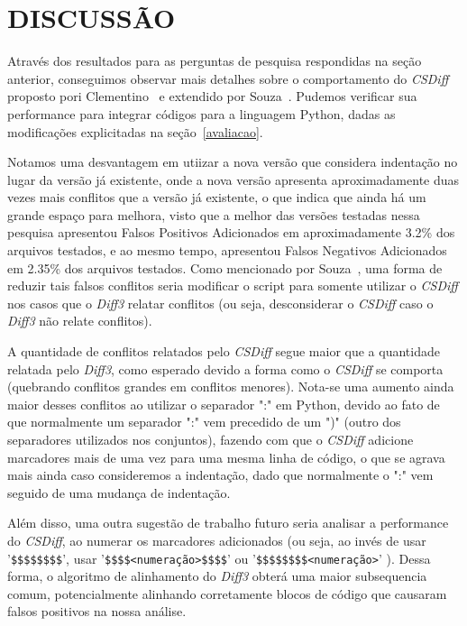 \section{DISCUSSÃO}\label{discussao}

Através dos resultados para as perguntas de pesquisa respondidas na seção
anterior, conseguimos observar mais detalhes sobre o comportamento do
\emph{CSDiff} proposto pori Clementino~\cite{clem21} e extendido por
Souza~\cite{heitor21}. Pudemos verificar sua performance para integrar códigos
para a linguagem Python, dadas as modificações explicitadas na
seção~\ref{avaliacao}.

Notamos uma desvantagem em utiizar a nova versão que considera indentação no
lugar da versão já existente, onde a nova versão apresenta aproximadamente duas
vezes mais conflitos que a versão já existente, o que indica que ainda há um
grande espaço para melhora, visto que a melhor das versões testadas nessa
pesquisa apresentou Falsos Positivos Adicionados em aproximadamente 3.2\% dos
arquivos testados, e ao mesmo tempo, apresentou Falsos Negativos Adicionados em
2.35\% dos arquivos testados. Como mencionado por Souza~\cite{heitor21}, uma
forma de reduzir tais falsos conflitos seria modificar o script para somente
utilizar o \emph{CSDiff} nos casos que o \emph{Diff3} relatar conflitos (ou
seja, desconsiderar o \emph{CSDiff} caso o \emph{Diff3} não relate conflitos).

A quantidade de conflitos relatados pelo \emph{CSDiff} segue maior que a
quantidade relatada pelo \emph{Diff3}, como esperado devido a forma como o
\emph{CSDiff} se comporta (quebrando conflitos grandes em conflitos menores).
Nota-se uma aumento ainda maior desses conflitos ao utilizar o separador ":" em
Python, devido ao fato de que normalmente um separador ":" vem precedido de um
")" (outro dos separadores utilizados nos conjuntos), fazendo com que o
\emph{CSDiff} adicione marcadores mais de uma vez para uma mesma linha de
código, o que se agrava mais ainda caso consideremos a indentação, dado que
normalmente o ":" vem seguido de uma mudança de indentação.

Além disso, uma outra sugestão de trabalho futuro seria analisar a performance
do \emph{CSDiff}, ao numerar os marcadores adicionados (ou seja, ao invés de
usar '\verb|$$$$$$$$|', usar '\verb|$$$$<numeração>$$$$|' ou
'\verb|$$$$$$$$<numeração>|' ). Dessa forma, o algoritmo de alinhamento do
\emph{Diff3} obterá uma maior subsequencia comum, potencialmente alinhando
corretamente blocos de código que causaram falsos positivos na nossa análise.

